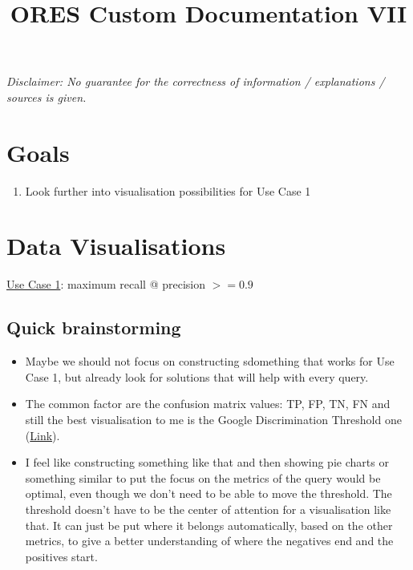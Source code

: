 \documentclass[12pt,a4paper]{article}
\title{ORES Custom Documentation VII}
\date{}
\begin{document}
\maketitle
\textit{Disclaimer: No guarantee for the correctness of information / explanations / sources is given.}\\
%
%
%
\section*{Goals}
\begin{enumerate}
\item Look further into visualisation possibilities for Use Case 1
\end{enumerate}
\section{Data Visualisations}
\underline{Use Case 1}: maximum recall @ precision $>=0.9$\\
%
\subsection{Quick brainstorming}
\begin{itemize}
\item Maybe we should not focus on constructing sdomething that works for Use Case 1, but already look for solutions that will help with every query.
\item The common factor are the confusion matrix values: TP, FP, TN, FN and still the best visualisation to me is the Google Discrimination Threshold one (\href{https://research.google.com/bigpicture/attacking-discrimination-in-ml/}{Link}).
\item I feel like constructing something like that and then showing pie charts or something similar to put the focus on the metrics of the query would be optimal, even though we don't need to be able to move the threshold. The threshold doesn't have to be the center of attention for a visualisation like that. It can just be put where it belongs automatically, based on the other metrics, to give a better understanding of where the negatives end and the positives start. 
\end{itemize}
%
\end{document}
